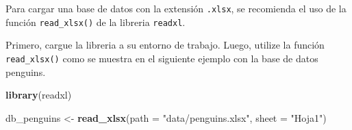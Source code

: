 \documentclass[
]{article}
\newenvironment{Shaded}{\begin{snugshade}}{\end{snugshade}}
\newcommand{\AttributeTok}[1]{\textcolor[rgb]{0.13,0.29,0.53}{#1}}
\newcommand{\FunctionTok}[1]{\textcolor[rgb]{0.13,0.29,0.53}{\textbf{#1}}}
\newcommand{\NormalTok}[1]{#1}
\newcommand{\OtherTok}[1]{\textcolor[rgb]{0.56,0.35,0.01}{#1}}
\newcommand{\StringTok}[1]{\textcolor[rgb]{0.31,0.60,0.02}{#1}}
\begin{document}
Para cargar una base de datos con la extensión \texttt{.xlsx}, se
recomienda el uso de la función \texttt{read\_xlsx()} de la libreria
\texttt{readxl}.

Primero, cargue la libreria a su entorno de trabajo. Luego, utilize la
función \texttt{read\_xlsx()} como se muestra en el siguiente ejemplo
con la base de datos penguins.

\begin{Shaded}
\begin{Highlighting}[]
\FunctionTok{library}\NormalTok{(readxl)}

\NormalTok{db\_penguins }\OtherTok{\textless{}{-}} \FunctionTok{read\_xlsx}\NormalTok{(}\AttributeTok{path =} \StringTok{"data/penguins.xlsx"}\NormalTok{,}
                         \AttributeTok{sheet =} \StringTok{"Hoja1"}\NormalTok{)}
\end{Highlighting}
\end{Shaded}
\end{document}
